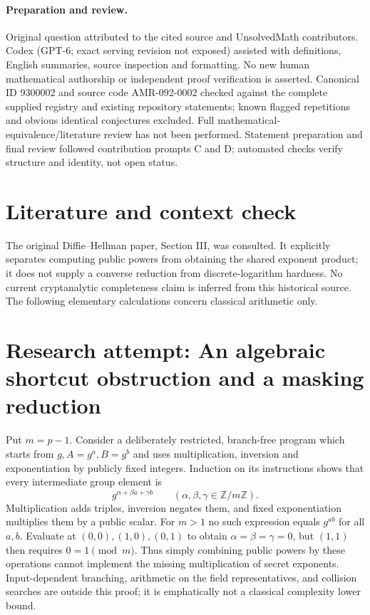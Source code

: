\documentclass[11pt]{article}
\begin{document}
\paragraph{Preparation and review.}
Original question attributed to the cited source and UnsolvedMath contributors. Codex (GPT-6; exact serving revision not exposed) assisted with definitions, English summaries, source inspection and formatting. No new human mathematical authorship or independent proof verification is asserted. Canonical ID 9300002 and source code AMR-092-0002 checked against the complete supplied registry and existing repository statements; known flagged repetitions and obvious identical conjectures excluded. Full mathematical-equivalence/literature review has not been performed. Statement preparation and final review followed contribution prompts C and D; automated checks verify structure and identity, not open status.
\label{end:9300002}

\section{Literature and context check}
The original Diffie--Hellman paper, Section III, was consulted. It explicitly
separates computing public powers from obtaining the shared exponent product;
it does not supply a converse reduction from discrete-logarithm hardness. No
current cryptanalytic completeness claim is inferred from this historical source.
The following elementary calculations concern classical arithmetic only.
\section{Research attempt: An algebraic shortcut obstruction and a masking reduction}
Put $m=p-1$. Consider a deliberately restricted, branch-free program which
starts from $g,A=g^a,B=g^b$ and uses multiplication, inversion and exponentiation
by publicly fixed integers. Induction on its instructions shows that every
intermediate group element is
\[
 g^{\alpha+\beta a+\gamma b}\qquad(\alpha,\beta,\gamma\in\mathbb Z/m\mathbb Z).
\]
Multiplication adds triples, inversion negates them, and fixed exponentiation
multiplies them by a public scalar. For $m>1$ no such expression equals $g^{ab}$
for all $a,b$. Evaluate at $(0,0),(1,0),(0,1)$ to obtain
$\alpha=\beta=\gamma=0$, but $(1,1)$ then requires $0=1\pmod m$.
Thus simply combining public powers by these operations cannot implement the
missing multiplication of secret exponents. Input-dependent branching, arithmetic
on the field representatives, and collision searches are outside this proof;
it is emphatically not a classical complexity lower bound.
\end{document}
